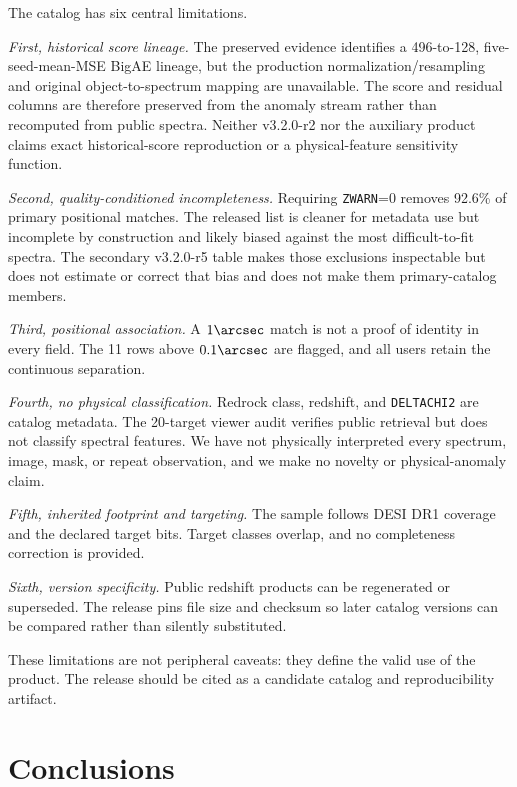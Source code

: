 \documentclass[twocolumn]{aastex701}
\newcommand{\releaseVersion}{v3.2.0-r2}
\newcommand{\warnedAuxVersion}{v3.2.0-r5}
\begin{document}
The catalog has six central limitations.

\textit{First, historical score lineage.}  The preserved evidence identifies a 496-to-128,
five-seed-mean-MSE BigAE lineage, but the production normalization/resampling and original
object-to-spectrum mapping are unavailable.  The score and residual columns are therefore
preserved from the anomaly stream rather than recomputed from public spectra.  Neither
\releaseVersion{} nor the auxiliary product claims exact historical-score reproduction or a
physical-feature sensitivity function.

\textit{Second, quality-conditioned incompleteness.}  Requiring \texttt{ZWARN}=0 removes 92.6\%
of primary positional matches.  The released list is cleaner for metadata use but incomplete by
construction and likely biased against the most difficult-to-fit spectra.  The secondary
\warnedAuxVersion{} table makes those exclusions inspectable but does not estimate or correct that
bias and does not make them primary-catalog members.

\textit{Third, positional association.}  A $1\arcsec$ match is not a proof of identity in every
field.  The 11 rows above $0.1\arcsec$ are flagged, and all users retain the continuous separation.

\textit{Fourth, no physical classification.}  Redrock class, redshift, and \texttt{DELTACHI2} are
catalog metadata.  The 20-target viewer audit verifies public retrieval but does not classify
spectral features.  We have not physically interpreted every spectrum, image, mask, or repeat
observation, and we make no novelty or physical-anomaly claim.

\textit{Fifth, inherited footprint and targeting.}  The sample follows DESI DR1 coverage and the
declared target bits.  Target classes overlap, and no completeness correction is provided.

\textit{Sixth, version specificity.}  Public redshift products can be regenerated or superseded.
The release pins file size and checksum so later catalog versions can be compared rather than
silently substituted.

These limitations are not peripheral caveats: they define the valid use of the product.  The
release should be cited as a candidate catalog and reproducibility artifact.

\section{Conclusions}\label{sec:conclusions}
\end{document}
